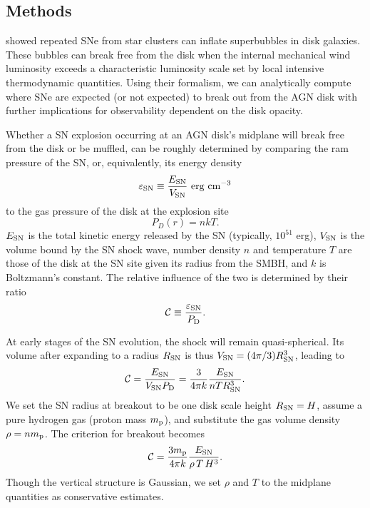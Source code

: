 
\subsection{Methods}
\label{sec:methods-snhydro}




\citet{MacLowMcCray88} showed repeated SNe from star clusters can inflate superbubbles in disk galaxies.
These bubbles can break free from the disk when the internal mechanical wind luminosity exceeds a characteristic luminosity scale set by local intensive thermodynamic quantities.
Using their formalism, we can analytically compute where SNe are expected (or not expected) to break out from the AGN disk with further implications for observability dependent on the disk opacity.

Whether a SN explosion occurring at an AGN disk's midplane will break free from the disk or be muffled, can be roughly determined by comparing the ram pressure of the SN, or, equivalently, its energy density
\begin{equation}
    \varepsilon_{\rm SN} \equiv \frac{E_{\rm SN}}{V_{\rm SN}}\ {\rm erg\ cm^{-3}}
\end{equation}
to the gas pressure of the disk at the explosion site
\begin{equation}
    P_D(r) = n k T.
\end{equation}
$E_{\rm SN}$ is the total kinetic energy released by the SN (typically, $10^{51}$ erg), $V_{\rm SN}$ is the volume bound by the SN shock wave, number density $n$ and temperature $T$ are those of the disk at the SN site given its radius from the SMBH, and $k$ is Boltzmann's constant.
The relative influence of the two is determined by their ratio
\begin{equation}
    \mathcal{C} \equiv \frac{\varepsilon_{\rm SN}}{P_{\rm D}}.
\end{equation}

At early stages of the SN evolution, the shock will remain quasi-spherical.
Its volume after expanding to a radius $R_{\rm SN}$ is thus $V_{\rm SN} = (4\pi/3) R_{\rm SN}^3$, leading to
\begin{equation}
    \mathcal{C} = \frac{E_{\rm SN}}{V_{\rm SN}P_{\rm D}} = \frac{3}{4\pi k} \frac{E_{\rm SN}}{n T R_{\rm SN}^3}.
\end{equation}
We set the SN radius at breakout to be one disk scale height $R_{\rm SN}=H$, assume a pure hydrogen gas (proton mass $m_{\rm p}$), and substitute the gas volume density $\rho=nm_{\rm p}$. The criterion for breakout becomes 
\begin{equation} \label{eqn:C}
    \mathcal{C} = \frac{3m_{\rm p}}{4\pi k}\frac{E_{\rm SN}}{\rho \,T\,H^3}.
\end{equation}
Though the vertical structure is Gaussian, we set $\rho$ and $T$ to the midplane quantities as conservative estimates.

